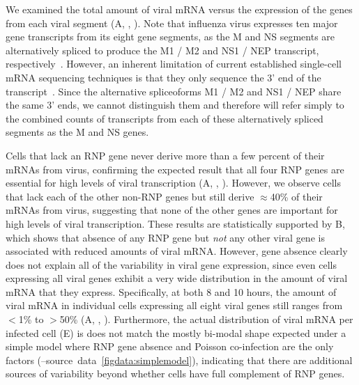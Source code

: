 \documentclass[9pt,lineno]{elife}
\begin{document}
\begin{figure}[t!]


\end{figure}

We examined the total amount of viral mRNA versus the expression of the genes from each viral segment (A, , ). 
Note that influenza virus expresses ten major gene transcripts from its eight gene segments, as the M and NS segments are alternatively spliced to produce the M1 / M2 and NS1 / NEP transcript, respectively~\citep{dubois2014influenza}.
However, an inherent limitation of current established single-cell mRNA sequencing techniques is that they only sequence the 3' end of the transcript~\citep{zheng2017massively,macosko2015highly,Klein:2015ki,cao2017comprehensive}.
Since the alternative spliceoforms M1 / M2 and NS1 / NEP share the same 3' ends, we cannot distinguish them and therefore will refer simply to the combined counts of transcripts from each of these alternatively spliced segments as the M and NS genes.

Cells that lack an RNP gene never derive more than a few percent of their mRNAs from virus, confirming the expected result that all four RNP genes are essential for high levels of viral transcription (A, , ).
However, we observe cells that lack each of the other non-RNP genes but still derive $\approx$40\% of their mRNAs from virus, suggesting that none of the other genes are important for high levels of viral transcription.
These results are statistically supported by B, which shows that absence of any RNP gene but \emph{not} any other viral gene is associated with reduced amounts of viral mRNA. 
However, gene absence clearly does not explain all of the variability in viral gene expression, since even cells expressing all viral genes exhibit a very wide distribution in the amount of viral mRNA that they express.
Specifically, at both 8 and 10 hours, the amount of viral mRNA in individual cells expressing all eight viral genes still ranges from $<$1\% to $>$50\% (A, , ).  
Furthermore, the actual distribution of viral mRNA per infected cell (E) is does not match the mostly bi-modal shape expected under a simple model where RNP gene absence and Poisson co-infection are the only factors (--source~data~\ref{figdata:simplemodel}), indicating that there are additional sources of variability beyond whether cells have full complement of RNP genes. 
\end{document}
